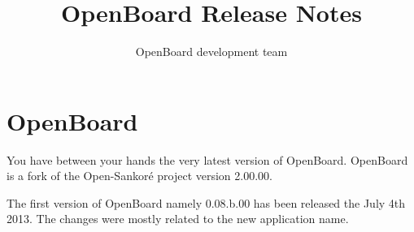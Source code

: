 \documentclass[a4paper]{report}
\begin{document}
\thispagestyle{empty} %
\title{\Huge \bfseries OpenBoard Release Notes\newline}
\author{OpenBoard development team}

\maketitle
\setcounter{page}{1}
\tableofcontents


\pagestyle{fancy}
\chapter*{OpenBoard}
\noindent

You have between your hands the very latest version of OpenBoard. OpenBoard is a fork of the Open-Sankor\'e project version 2.00.00. \newline

The first version of OpenBoard namely 0.08.b.00 has been released the July 4th 2013. The changes were mostly related to the new application name.

\setcounter{page}{1}
\end{document}
